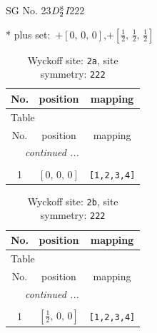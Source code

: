 \documentclass[fleqn,8pt]{jsarticle}
\begin{document}
\setcounter{MaxMatrixCols}{32}

\renewcommand{\tablename}{Table~}
\renewcommand{\figurename}{Figure~}
\begin{center}
\LARGE
SG No. 23\quad$D_{\rm 2}^{8}$\quad$I222$\quad[ orthorhombic ]
\end{center}
* plus set:\,\,\,$+\left[ 0,\, 0,\, 0 \right]$,\quad $+\left[ \frac{1}{2},\, \frac{1}{2},\, \frac{1}{2} \right]$
\renewcommand{\arraystretch}{1.2}
\begin{longtable}{ccc}
\caption{Wyckoff site: {\tt 2a}, site symmetry: {\tt 222}}
 \\
 \hline \hline
No. & position & mapping \\ \hline \endfirsthead

\multicolumn{2}{l}{\tablename\ \thetable{}} \\
 \hline \hline
No. & position & mapping \\ \hline \endhead

 \hline \hline
\multicolumn{2}{r}{\footnotesize\it continued ...} \\ \endfoot

 \hline \hline
\multicolumn{2}{r}{} \\ \endlastfoot

1 & $\left[ 0,\, 0,\, 0 \right]$ & {\tt [1,2,3,4]} \\
\end{longtable}
\renewcommand{\arraystretch}{1.2}
\begin{longtable}{ccc}
\caption{Wyckoff site: {\tt 2b}, site symmetry: {\tt 222}}
 \\
 \hline \hline
No. & position & mapping \\ \hline \endfirsthead

\multicolumn{2}{l}{\tablename\ \thetable{}} \\
 \hline \hline
No. & position & mapping \\ \hline \endhead

 \hline \hline
\multicolumn{2}{r}{\footnotesize\it continued ...} \\ \endfoot

 \hline \hline
\multicolumn{2}{r}{} \\ \endlastfoot

1 & $\left[ \frac{1}{2},\, 0,\, 0 \right]$ & {\tt [1,2,3,4]} \\
\end{longtable}
\renewcommand{\arraystretch}{1.2}
\end{document}
